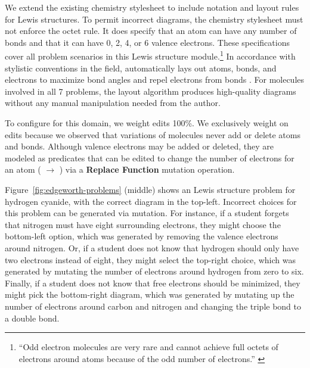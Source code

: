 

We extend the existing \Penrose chemistry stylesheet to include notation and layout rules for Lewis structures. To permit incorrect diagrams, the chemistry stylesheet must not enforce the octet rule. It does specify that an atom can have any number of bonds and that it can have 0, 2, 4, or 6 valence electrons. These specifications cover all problem scenarios in this Lewis structure module.\footnote{``Odd electron molecules are very rare and cannot achieve full octets of electrons around atoms because of the odd number of electrons.'' \cite{oli}} In accordance with stylistic conventions in the field, \Edgeworth automatically lays out atoms, bonds, and electrons to maximize bond angles and repel electrons from bonds 
. For molecules involved in all 7 problems, the layout algorithm produces high-quality diagrams without any manual manipulation needed from the author. 

To configure \Edgeworth for this domain, we weight edits 100\%. We exclusively weight on edits because we observed that variations of molecules never add or delete atoms and bonds. Although valence electrons may be added or deleted, they are modeled as predicates that can be edited to change the number of electrons for an atom (\eg {} $\rightarrow$ ) via a \textbf{Replace Function} mutation operation. 

Figure~\ref{fig:edgeworth-problems} (middle) shows an \Edgeworth Lewis structure problem for hydrogen cyanide, with the correct diagram in the top-left. Incorrect choices for this problem can be generated via mutation. For instance, if a student forgets that nitrogen must have eight surrounding electrons, they might choose the bottom-left option, which was generated by removing the valence electrons around nitrogen. Or, if a student does not know that hydrogen should only have two electrons instead of eight, they might select the top-right choice, which was generated by mutating the number of electrons around hydrogen from zero to six. Finally, if a student does not know that free electrons should be minimized, they might pick the bottom-right diagram, which was generated by mutating up the number of electrons around carbon and nitrogen and changing the triple bond to a double bond.

